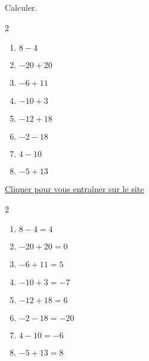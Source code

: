 \begin{exercice*}
    Calculer.
    \begin{multicols}2
        \begin{enumerate}
            \item $ 8-4 $
            \item $ -20+20 $
            \item $ -6+11 $
            \item $ -10+3 $
            \item $ -12+18 $
            \item $ -2-18 $
            \item $ 4-10 $
            \item $ -5+13 $
        \end{enumerate}
    \end{multicols}

    \href{https://coopmaths.fr/mathalea.html?ex=5R20,s=20,s2=true,s3=false,n=8,i=1&v=l}{Cliquer pour vous entraîner sur le site \mathaleaLogo} 
\end{exercice*}
\begin{corrige}
    \phantom{rrr}    
    \begin{multicols}2
        \begin{enumerate}
            \item $ 8-4 = 4 $
            \item $ -20+20 = 0 $
            \item $ -6+11 = 5 $
            \item $ -10+3 = -7 $
            \item $ -12+18 = 6 $
            \item $ -2-18 = -20 $
            \item $ 4-10 = -6 $
            \item $ -5+13 = 8 $
        \end{enumerate}
    \end{multicols}
\end{corrige}
